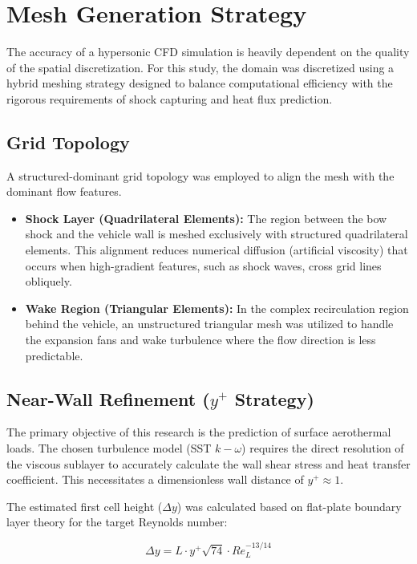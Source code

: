 \section{Mesh Generation Strategy}
The accuracy of a hypersonic CFD simulation is heavily dependent on the quality of the spatial discretization. For this study, the domain was discretized using a hybrid meshing strategy designed to balance computational efficiency with the rigorous requirements of shock capturing and heat flux prediction.

\subsection{Grid Topology}
A structured-dominant grid topology was employed to align the mesh with the dominant flow features.
\begin{itemize}
    \item \textbf{Shock Layer (Quadrilateral Elements):} The region between the bow shock and the vehicle wall is meshed exclusively with structured quadrilateral elements. This alignment reduces numerical diffusion (artificial viscosity) that occurs when high-gradient features, such as shock waves, cross grid lines obliquely.
    \item \textbf{Wake Region (Triangular Elements):} In the complex recirculation region behind the vehicle, an unstructured triangular mesh was utilized to handle the expansion fans and wake turbulence where the flow direction is less predictable.
\end{itemize}



\subsection{Near-Wall Refinement ($y^+$ Strategy)}
The primary objective of this research is the prediction of surface aerothermal loads. The chosen turbulence model (SST $k-\omega$) requires the direct resolution of the viscous sublayer to accurately calculate the wall shear stress and heat transfer coefficient. This necessitates a dimensionless wall distance of $y^+ \approx 1$.

The estimated first cell height ($\Delta y$) was calculated based on flat-plate boundary layer theory for the target Reynolds number:

\begin{equation}
    \Delta y = L \cdot y^+ \sqrt{74} \cdot Re_L^{-13/14}
\end{equation}

